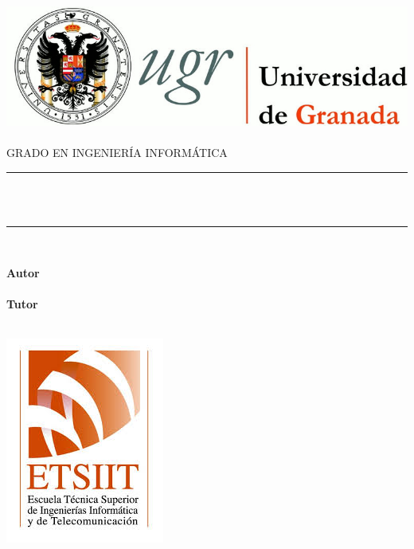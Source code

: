 \begin{titlepage}

\begin{minipage}{\textwidth}

\centering

\includegraphics[scale=0.3]{img/logo_ugr.jpg}\\[1cm]

\textsc{\Large \asignatura{}\\[0.2cm]}
\textsc{GRADO EN INGENIERÍA INFORMÁTICA}\\[1cm]

\noindent\rule[-1ex]{\textwidth}{1pt}\\[1.5ex]
\textbf{{\Large \titulo\\[0.5ex]}}
\noindent\rule[-1ex]{\textwidth}{3pt}\\[3.5ex]

\end{minipage}

\vspace{0.8cm}

\begin{minipage}{\textwidth}

\centering

\textbf{Autor}\\ {\autor{}}\\[2.5ex]
\textbf{Tutor}\\ {\tutor}\\[2.5ex]
\vspace{0.3cm}

\includegraphics[scale=0.3]{img/etsiit.jpeg}


\end{minipage}
\end{titlepage}
